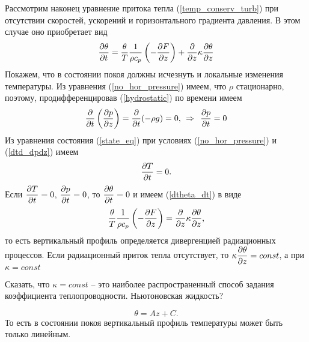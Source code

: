     Рассмотрим наконец уравнение притока тепла (\ref{temp_conserv_turb}) при отсутствии скоростей, ускорений и горизонтального градиента давления. В этом случае оно приобретает вид
   \begin{equation}
    \label{dtheta_dt}
        \displaystyle\frac{\partial \theta}{\partial t} = \frac{\theta}{T}\frac{1}{\rho c_p}\left( -\displaystyle\frac{\partial F}{\partial z} \right)+\frac{\partial}{\partial z}\kappa\displaystyle\frac{\partial \theta}{\partial z} 
    \end{equation}
    Покажем, что в состоянии покоя должны исчезнуть и  локальные изменения температуры. Из уравнения (\ref{no_hor_pressure}) имеем, что $\rho$ стационарно, поэтому, продифференцировав (\ref{hydrostatic}) по времени имеем
    \begin{equation}
    \label{dtd_dpdz}
        \displaystyle\frac{\partial }{\partial t}\left(\displaystyle\frac{\partial p}{\partial z}\right) = \frac{\partial}{\partial t}(-\rho g)=0, \:\: \Rightarrow   \:\:  \displaystyle\frac{\partial p}{\partial t}=0
    \end{equation}
    Из уравнения состояния (\ref{state_eq}) при условиях (\ref{no_hor_pressure}) и (\ref{dtd_dpdz}) имеем
    \begin{equation}
        \displaystyle\frac{\partial T}{\partial t} = 0.
    \end{equation}
    Если $\displaystyle\frac{\partial T}{\partial t} = 0$, $\displaystyle\frac{\partial p}{\partial t} = 0$, то $\displaystyle\frac{\partial \theta}{\partial t} = 0$ и имеем (\ref{dtheta_dt}) в виде
   \begin{equation}
        \frac{\theta}{T}\frac{1}{\rho c_p}\left( -\displaystyle\frac{\partial F}{\partial z} \right)=\frac{\partial}{\partial z}\kappa\displaystyle\frac{\partial \theta}{\partial z}, 
    \end{equation}
    то есть вертикальный профиль определяется дивергенцией радиационных процессов. Если радиационный приток тепла  отсутствует, то $\kappa\displaystyle\frac{\partial \theta}{\partial z}=const$, а при $\kappa=const$ 
\begin{warn}
Сказать, что $\kappa=const$ -- это наиболее распространенный способ задания коэффициента теплопроводности. Ньютоновская жидкость?  
\end{warn}
   \begin{equation}
        \theta = Az+C. 
    \end{equation} 
    То есть в состоянии покоя вертикальный профиль температуры может быть только линейным.


